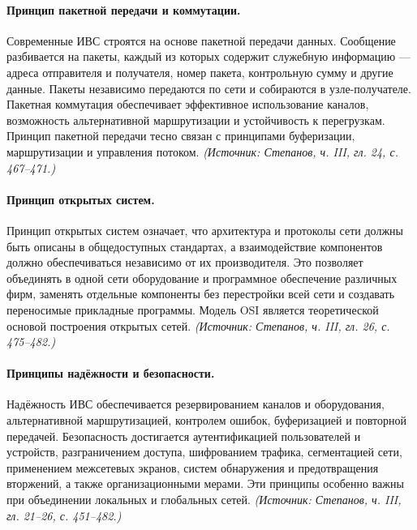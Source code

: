 \documentclass[a4paper,12pt]{article}
\begin{document}
\paragraph{Принцип пакетной передачи и коммутации.}
Современные ИВС строятся на основе пакетной передачи данных. Сообщение разбивается на пакеты, каждый из которых содержит служебную информацию — адреса отправителя и получателя, номер пакета, контрольную сумму и другие данные. Пакеты независимо передаются по сети и собираются в узле-получателе. Пакетная коммутация обеспечивает эффективное использование каналов, возможность альтернативной маршрутизации и устойчивость к перегрузкам. Принцип пакетной передачи тесно связан с принципами буферизации, маршрутизации и управления потоком.
\textit{(Источник: Степанов, ч. III, гл. 24, с. 467–471.)}

\paragraph{Принцип открытых систем.}
Принцип открытых систем означает, что архитектура и протоколы сети должны быть описаны в общедоступных стандартах, а взаимодействие компонентов должно обеспечиваться независимо от их производителя. Это позволяет объединять в одной сети оборудование и программное обеспечение различных фирм, заменять отдельные компоненты без перестройки всей сети и создавать переносимые прикладные программы. Модель OSI является теоретической основой построения открытых сетей.
\textit{(Источник: Степанов, ч. III, гл. 26, с. 475–482.)}

\paragraph{Принципы надёжности и безопасности.}
Надёжность ИВС обеспечивается резервированием каналов и оборудования, альтернативной маршрутизацией, контролем ошибок, буферизацией и повторной передачей. Безопасность достигается аутентификацией пользователей и устройств, разграничением доступа, шифрованием трафика, сегментацией сети, применением межсетевых экранов, систем обнаружения и предотвращения вторжений, а также организационными мерами. Эти принципы особенно важны при объединении локальных и глобальных сетей.
\textit{(Источник: Степанов, ч. III, гл. 21–26, с. 451–482.)}
\end{document}
